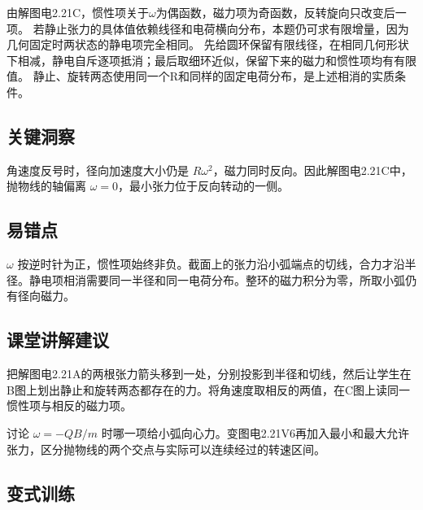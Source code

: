 \documentclass[UTF8,fontset=fandol,a4paper,11pt]{ctexart}
\begin{document}
由解图电2.21C，惯性项关于$\omega$为偶函数，磁力项为奇函数，反转旋向只改变后一项。
若静止张力的具体值依赖线径和电荷横向分布，本题仍可求有限增量，因为几何固定时两状态的静电项完全相同。
先给圆环保留有限线径，在相同几何形状下相减，静电自斥逐项抵消；最后取细环近似，保留下来的磁力和惯性项均有有限值。
静止、旋转两态使用同一个R和同样的固定电荷分布，是上述相消的实质条件。




\subsection*{关键洞察}

角速度反号时，径向加速度大小仍是 $R\omega^2$，磁力同时反向。因此解图电2.21C中，抛物线的轴偏离 $\omega=0$，最小张力位于反向转动的一侧。



\subsection*{易错点}

$\omega$ 按逆时针为正，惯性项始终非负。截面上的张力沿小弧端点的切线，合力才沿半径。静电项相消需要同一半径和同一电荷分布。整环的磁力积分为零，所取小弧仍有径向磁力。



\subsection*{课堂讲解建议}

把解图电2.21A的两根张力箭头移到一处，分别投影到半径和切线，然后让学生在B图上划出静止和旋转两态都存在的力。将角速度取相反的两值，在C图上读同一惯性项与相反的磁力项。

讨论 $\omega=-QB/m$ 时哪一项给小弧向心力。变图电2.21V6再加入最小和最大允许张力，区分抛物线的两个交点与实际可以连续经过的转速区间。


\subsection*{变式训练}
\end{document}
